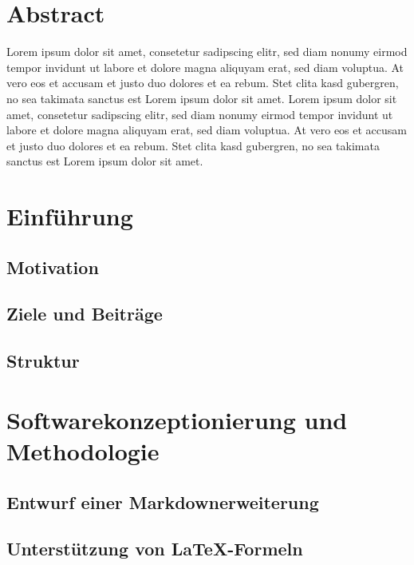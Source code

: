 \documentclass{article}
\begin{document}
\maketitle
\section*{Abstract}
Lorem ipsum dolor sit amet, consetetur sadipscing elitr, sed diam nonumy eirmod tempor invidunt ut labore et dolore magna aliquyam erat, sed diam voluptua. At vero eos et accusam et justo duo dolores et ea rebum. Stet clita kasd gubergren, no sea takimata sanctus est Lorem ipsum dolor sit amet. Lorem ipsum dolor sit amet, consetetur sadipscing elitr, sed diam nonumy eirmod tempor invidunt ut labore et dolore magna aliquyam erat, sed diam voluptua. At vero eos et accusam et justo duo dolores et ea rebum. Stet clita kasd gubergren, no sea takimata sanctus est Lorem ipsum dolor sit amet.
\tableofcontents
\newpage


\section{Einführung}
\subsection{Motivation}
\subsection{Ziele und Beitr\"age}
\subsection{Struktur}
\section{Softwarekonzeptionierung und Methodologie}
\subsection{Entwurf einer Markdownerweiterung}
\subsection{Unterst\"utzung von \LaTeX-Formeln}
\end{document}
